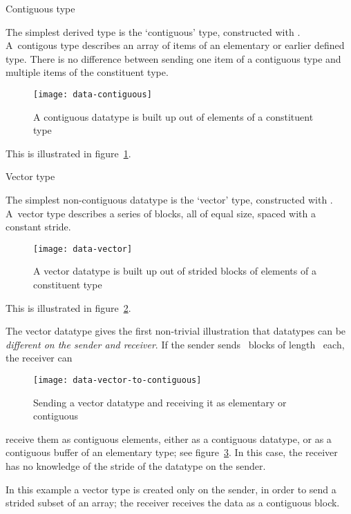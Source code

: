  {Contiguous type}
\label{sec:data:contiguous}

The simplest derived type is the `contiguous' type,
constructed with .
%
%
A~contigous type describes an array of items
of an elementary or earlier defined type. There is no difference between sending
one item of a contiguous type and multiple items of the constituent type.
\begin{figure}[ht]
  \texttt{[image: data-contiguous]}
  \caption{A contiguous datatype is built up out of elements of a constituent type}
  \label{fig:data-contiguous}
\end{figure}
This is illustrated in figure~\ref{fig:data-contiguous}.



 {Vector type}
\label{sec:data:vector}

The simplest non-contiguous datatype is the `vector' type, constructed with
.
%
%
A~vector type describes a series of blocks, all 
of equal size, spaced with a constant stride.
\begin{figure}[ht]
  \texttt{[image: data-vector]}
  \caption{A vector datatype is built up out of strided blocks of elements of a constituent type}
  \label{fig:data-vector}
\end{figure}
This is illustrated in figure~\ref{fig:data-vector}.

The vector datatype gives the first non-trivial illustration that
datatypes can be \emph{different on the sender and
  receiver}. If the
sender sends ~blocks of length~ each, the receiver can
%
\begin{figure}
  \texttt{[image: data-vector-to-contiguous]}
  \caption{Sending a vector datatype and receiving it as elementary or
    contiguous}
  \label{fig:data-vector-to-contiguous}
\end{figure}
%
receive them as  contiguous elements, either as a contiguous
datatype, or as a contiguous buffer of an elementary type; see
figure~\ref{fig:data-vector-to-contiguous}. In this case, the receiver
has no knowledge of the stride of the datatype on the sender.

In this example a vector type is created only on the sender, in order to send
a strided subset of an array; the receiver receives the data as a contiguous block.
%
%

